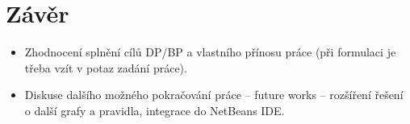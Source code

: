 \chapter{Závěr}

\begin{itemize}
\item Zhodnocení splnění cílů DP/BP a  vlastního přínosu práce (při formulaci je třeba vzít v potaz zadání práce).
\item Diskuse dalšího možného pokračování práce -- future works -- rozšíření řešení o další grafy a pravidla, integrace do NetBeans IDE.
\end{itemize}
